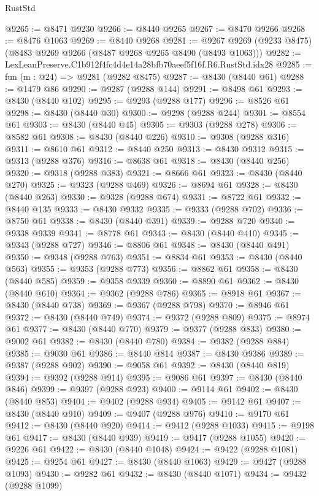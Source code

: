 \begin{lexlean}{RustStd}
\begin{coremodule}
@9265 := @8471 @9230
@9266 := @8440 @9265
@9267 := @8470 @9266
@9268 := @8476 @1063
@9269 := @8440 @9268
@9281 := @9267 @9269 (@9233 @8475) (@8483 @9269 @9266 (@8487 @9268 @9265 @8490 (@8493 @1063)))
@9282 := LexLeanPreserve.C1b912f4fc4d4e14a28bfb70aeef5f16f.R6.RustStd.idx28
@9285 := fun (m : @24) => @9281 (@9282 @8475)
@9287 := @8430 (@8440 @61)
@9288 := @1479 @86
@9290 := @9287 (@9288 @144)
@9291 := @8498 @61
@9293 := @8430 (@8440 @102)
@9295 := @9293 (@9288 @177)
@9296 := @8526 @61
@9298 := @8430 (@8440 @30)
@9300 := @9298 (@9288 @244)
@9301 := @8554 @61
@9303 := @8430 (@8440 @45)
@9305 := @9303 (@9288 @278)
@9306 := @8582 @61
@9308 := @8430 (@8440 @226)
@9310 := @9308 (@9288 @316)
@9311 := @8610 @61
@9312 := @8440 @250
@9313 := @8430 @9312
@9315 := @9313 (@9288 @376)
@9316 := @8638 @61
@9318 := @8430 (@8440 @256)
@9320 := @9318 (@9288 @383)
@9321 := @8666 @61
@9323 := @8430 (@8440 @270)
@9325 := @9323 (@9288 @469)
@9326 := @8694 @61
@9328 := @8430 (@8440 @263)
@9330 := @9328 (@9288 @674)
@9331 := @8722 @61
@9332 := @8440 @135
@9333 := @8430 @9332
@9335 := @9333 (@9288 @702)
@9336 := @8750 @61
@9338 := @8430 (@8440 @391)
@9339 := @9288 @720
@9340 := @9338 @9339
@9341 := @8778 @61
@9343 := @8430 (@8440 @410)
@9345 := @9343 (@9288 @727)
@9346 := @8806 @61
@9348 := @8430 (@8440 @491)
@9350 := @9348 (@9288 @763)
@9351 := @8834 @61
@9353 := @8430 (@8440 @563)
@9355 := @9353 (@9288 @773)
@9356 := @8862 @61
@9358 := @8430 (@8440 @585)
@9359 := @9358 @9339
@9360 := @8890 @61
@9362 := @8430 (@8440 @610)
@9364 := @9362 (@9288 @786)
@9365 := @8918 @61
@9367 := @8430 (@8440 @738)
@9369 := @9367 (@9288 @798)
@9370 := @8946 @61
@9372 := @8430 (@8440 @749)
@9374 := @9372 (@9288 @809)
@9375 := @8974 @61
@9377 := @8430 (@8440 @770)
@9379 := @9377 (@9288 @833)
@9380 := @9002 @61
@9382 := @8430 (@8440 @780)
@9384 := @9382 (@9288 @884)
@9385 := @9030 @61
@9386 := @8440 @814
@9387 := @8430 @9386
@9389 := @9387 (@9288 @902)
@9390 := @9058 @61
@9392 := @8430 (@8440 @819)
@9394 := @9392 (@9288 @914)
@9395 := @9086 @61
@9397 := @8430 (@8440 @846)
@9399 := @9397 (@9288 @923)
@9400 := @9114 @61
@9402 := @8430 (@8440 @853)
@9404 := @9402 (@9288 @934)
@9405 := @9142 @61
@9407 := @8430 (@8440 @910)
@9409 := @9407 (@9288 @976)
@9410 := @9170 @61
@9412 := @8430 (@8440 @920)
@9414 := @9412 (@9288 @1033)
@9415 := @9198 @61
@9417 := @8430 (@8440 @939)
@9419 := @9417 (@9288 @1055)
@9420 := @9226 @61
@9422 := @8430 (@8440 @1048)
@9424 := @9422 (@9288 @1081)
@9425 := @9254 @61
@9427 := @8430 (@8440 @1063)
@9429 := @9427 (@9288 @1093)
@9430 := @9282 @61
@9432 := @8430 (@8440 @1071)
@9434 := @9432 (@9288 @1099)

\end{coremodule}
\end{lexlean}

